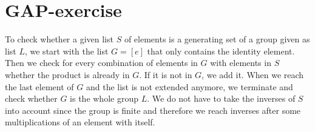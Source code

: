 \section{GAP-exercise}

To check whether a given list $S$ of elements is a generating set of a group given as list $L$, we start with the list $G = [e]$ that only contains the identity element. Then we check for every combination of elements in $G$ with elements in $S$ whether the product is already in $G$. If it is not in $G$, we add it. When we reach the last element of $G$ and the list is not extended anymore, we terminate and check whether $G$ is the whole group $L$. We do not have to take the inverses of $S$ into account since the group is finite and therefore we reach inverses after some multiplications of an element with itself.

